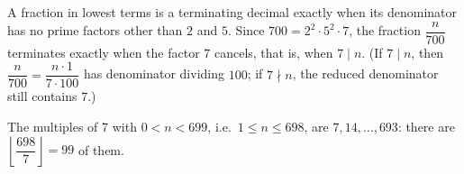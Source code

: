 A fraction in lowest terms is a terminating decimal exactly when its denominator has no prime factors other than $2$ and $5$. Since $700=2^2\cdot5^2\cdot7$, the fraction $\dfrac {n}{700}$ terminates exactly when the factor $7$ cancels, that is, when $7\mid n$. (If $7\mid n$, then $\dfrac {n}{700}=\dfrac{n\cdot 1}{7\cdot100}$ has denominator dividing $100$; if $7\nmid n$, the reduced denominator still contains $7$.)

The multiples of $7$ with $0<n<699$, i.e.\ $1\le n\le698$, are $7,14,\dots,693$: there are $\left\lfloor\dfrac{698}{7}\right\rfloor=\boxed{99}$ of them.
